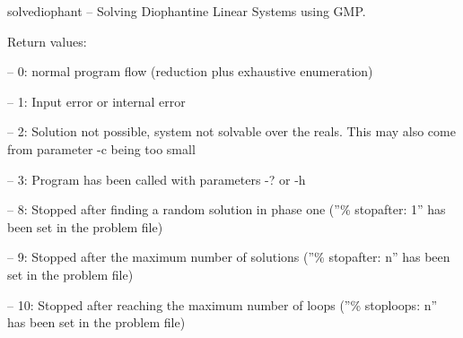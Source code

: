 
\datethis

solvediophant -- Solving Diophantine Linear Systems using GMP.

Return values:

-- 0: normal program flow (reduction plus exhaustive enumeration)

-- 1: Input error or internal error

-- 2: Solution not possible, system not solvable over the reals. This may also
come from
parameter -c being too small

-- 3: Program has been called with parameters -? or -h

-- 8: Stopped after finding a random solution in phase one (''\% stopafter: 1''
has been set in the problem file)

-- 9: Stopped after the maximum number of solutions (''\% stopafter: n'' has
been set in the problem file)

-- 10: Stopped after reaching the maximum number of loops (''\% stoploops: n''
has been set in the problem file)

\fi

